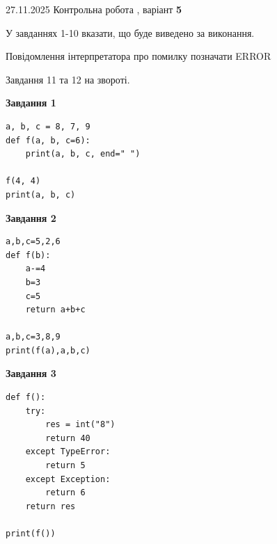 \documentclass[12pt, ukrainian]{article}
\begin{document}
{{{{{{ 27.11.2025 Контрольна робота , варіант  \No \textbf { 5 }\par}}
{

{%



У завданнях 1-10 вказати, що буде виведено за виконання.

Повідомлення інтерпретатора про помилку позначати ERROR

Завдання 11 та 12 на звороті.

\begin{minipage}[t]{7.5cm}

\begin{center}
\textbf{Завдання 1}
\end{center}

\begin{verbatim}
a, b, c = 8, 7, 9
def f(a, b, c=6):
    print(a, b, c, end=" ")

f(4, 4)
print(a, b, c)
\end{verbatim}



\begin{center}
\textbf{Завдання 2}
\end{center}

\begin{verbatim}
a,b,c=5,2,6
def f(b):
    a-=4
    b=3
    c=5
    return a+b+c

a,b,c=3,8,9
print(f(a),a,b,c)
\end{verbatim}



\begin{center}
\textbf{Завдання 3}
\end{center}

\begin{verbatim}
def f():
    try:
        res = int("8")
        return 40
    except TypeError: 
        return 5
    except Exception: 
        return 6
    return res

print(f())
\end{verbatim}




\end{minipage}}}}}}}
\end{document}

